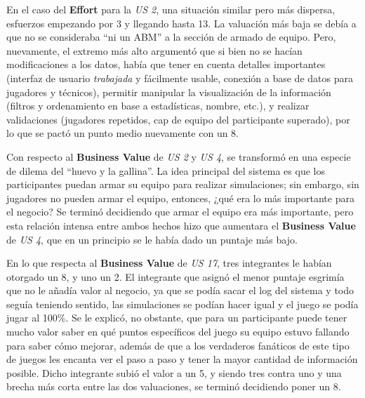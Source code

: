 En el caso del \textbf{Effort} para la \emph{US 2}, una situación similar pero más dispersa, esfuerzos empezando por 3 y llegando hasta 13. La valuación más baja se debía a que no se consideraba ``ni un ABM'' a la sección de armado de equipo. Pero, nuevamente, el extremo más alto argumentó que si bien no se hacían modificaciones a los datos, había que tener en cuenta detalles importantes (interfaz de usuario \emph{trabajada} y fácilmente usable, conexión a base de datos para jugadores y técnicos), permitir manipular la visualización de la información (filtros y ordenamiento en base a estadísticas, nombre, etc.), y realizar validaciones (jugadores repetidos, cap de equipo del participante superado), por lo que se pactó un punto medio nuevamente con un 8.

Con respecto al \textbf{Business Value} de \emph{US 2} y \emph{US 4}, se transformó en una especie de dilema del ``huevo y la gallina''. La idea principal del sistema es que los participantes puedan armar su equipo para realizar simulaciones; sin embargo, sin jugadores no pueden armar el equipo, entonces, ¿qué era lo más importante para el negocio? Se terminó decidiendo que armar el equipo era más importante, pero esta relación intensa entre ambos hechos hizo que aumentara el \textbf{Business Value} de \emph{US 4}, que en un principio se le había dado un puntaje más bajo.

En lo que respecta al \textbf{Business Value} de \emph{US 17}, tres integrantes le habían otorgado un 8, y uno un 2. El integrante que asignó el menor puntaje esgrimía que no le añadía valor al negocio, ya que se podía sacar el log del sistema y todo seguía teniendo sentido, las simulaciones se podían hacer igual y el juego se podía jugar al 100\%. Se le explicó, no obstante, que para un participante puede tener mucho valor saber en qué puntos específicos del juego su equipo estuvo fallando para saber cómo mejorar, además de que a los verdaderos fanáticos de este tipo de juegos les encanta ver el paso a paso y tener la mayor cantidad de información posible. Dicho integrante subió el valor a un 5, y siendo tres contra uno y una brecha más corta entre las dos valuaciones, se terminó decidiendo poner un 8.